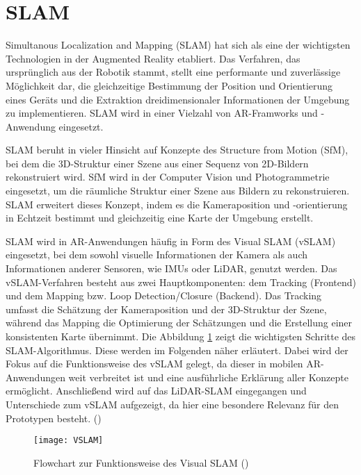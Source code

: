 \section{SLAM}\label{SLAM}

Simultanous Localization and Mapping (SLAM) hat sich als eine der wichtigsten Technologien in der Augmented Reality etabliert. Das Verfahren, das ursprünglich aus der Robotik stammt, stellt eine performante und zuverlässige Möglichkeit dar, die gleichzeitige Bestimmung der Position und Orientierung eines Geräts und die Extraktion dreidimensionaler Informationen der Umgebung zu implementieren. SLAM wird in einer Vielzahl von AR-Framworks und -Anwendung eingesetzt. \cite{doerner2022virtual}

SLAM beruht in vieler Hinsicht auf Konzepte des Structure from Motion (SfM), bei dem die 3D-Struktur einer Szene aus einer Sequenz von 2D-Bildern rekonstruiert wird. SfM wird in der Computer Vision und Photogrammetrie eingesetzt, um die räumliche Struktur einer Szene aus Bildern zu rekonstruieren. SLAM erweitert dieses Konzept, indem es die Kameraposition und -orientierung in Echtzeit bestimmt und gleichzeitig eine Karte der Umgebung erstellt.

SLAM wird in AR-Anwendungen häufig in Form des Visual SLAM (vSLAM) eingesetzt, bei dem sowohl visuelle Informationen der Kamera als auch Informationen anderer Sensoren, wie IMUs oder LiDAR, genutzt werden. Das vSLAM-Verfahren besteht aus zwei Hauptkomponenten: dem Tracking (Frontend) und dem Mapping bzw. Loop Detection/Closure (Backend). Das Tracking umfasst die Schätzung der Kameraposition und der 3D-Struktur der Szene, während das Mapping die Optimierung der Schätzungen und die Erstellung einer konsistenten Karte übernimmt. Die Abbildung \ref{fig:VSLAM} zeigt die wichtigsten Schritte des SLAM-Algorithmus. Diese werden im Folgenden näher erläutert. Dabei wird der Fokus auf die Funktionsweise des vSLAM gelegt, da dieser in mobilen AR-Anwendungen weit verbreitet ist und eine ausführliche Erklärung aller Konzepte ermöglicht. Anschließend wird auf das LiDAR-SLAM eingegangen und Unterschiede zum vSLAM aufgezeigt, da hier eine besondere Relevanz für den Prototypen besteht. (\cite{gao2021vSLAM, tourani2022vSLAMTrends, doerner2022virtual})

\begin{figure}
    \centering
    \texttt{[image: VSLAM]}
    \caption{Flowchart zur Funktionsweise des Visual SLAM (\cite{tourani2022vSLAMTrends})\label{fig:VSLAM}}\par
\end{figure}

